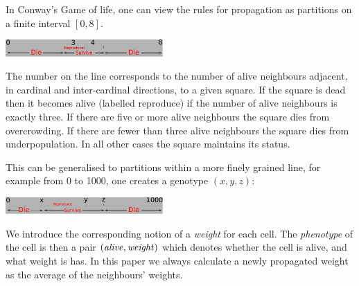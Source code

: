 \documentclass{AISB2008}
\begin{document}
In Conway's Game of life, one can view the rules for propagation as
partitions on a finite interval $[0,8]$.
\begin{center}
\includegraphics[width=0.45\textwidth]{conway.pdf}
\end{center}
The number on the line corresponds to the number of alive neighbours
adjacent, in cardinal and inter-cardinal directions, to a given
square. If the square is dead then it becomes alive (labelled
reproduce) if the number of alive neighbours is exactly three. If
there are five or more alive neighbours the square dies from
overcrowding. If there are fewer than three alive neighbours the
square dies from underpopulation. In all other cases the square
maintains its status.


This can be generalised to partitions within a more finely grained
line, for example from 0 to 1000, one creates a genotype $(x,y,z)$:
\begin{center}
\includegraphics[width=0.45\textwidth]{2dgenotype.pdf}
\end{center}
We introduce the corresponding notion of a {\em weight} for each cell.
The {\em phenotype} of the cell is then a pair $(\text{\emph{alive}},
\text{\emph{weight}})$ which denotes whether the cell is alive, and
what weight is has.  In this paper we always calculate a newly
propagated weight as the average of the neighbours' weights.
\end{document}
